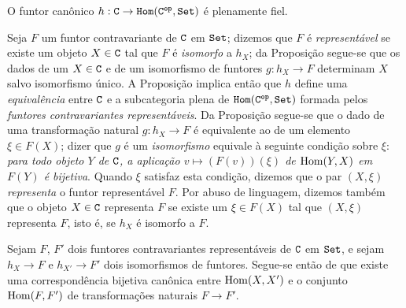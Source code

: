 \begin{proposition}[8.1.7]
\label{0.8.1.7}
O funtor canônico $h:\C\to\CHom(\C\op,\Set)$ é plenamente fiel.
\end{proposition}

\begin{env}[8.1.8]
\label{0.8.1.8}
Seja $F$ um funtor contravariante de $\mathtt{C}$ em $\mathtt{Set}$; dizemos que $F$ é \emph{representável} se
existe um objeto $X\in\mathtt{C}$ tal que $F$ é \emph{isomorfo} a $h_X$; da
Proposição  segue-se que os dados de um $X\in\mathtt{C}$ e de um isomorfismo de funtores
$g:h_X\to F$ determinam $X$ salvo isomorfismo único. A Proposição  implica então
que $h$ define uma \emph{equivalência} entre $\mathtt{C}$ e a subcategoria plena de
$\mathtt{Hom}(\mathtt{C}^\mathtt{op},\mathtt{Set})$ formada pelos \emph{funtores contravariantes representáveis}. Da
Proposição  segue-se que o dado de uma transformação natural $g:h_X\to F$ é
equivalente ao de um elemento $\xi\in F(X)$; dizer que $g$ é um \emph{isomorfismo} equivale
à seguinte condição sobre $\xi$: \emph{para todo objeto $Y$ de $\mathtt{C}$, a aplicação
$v\mapsto(F(v))(\xi)$ de $\operatorname{Hom}(Y,X)$ em $F(Y)$ é bijetiva}. Quando $\xi$ satisfaz esta condição,
dizemos que o par $(X,\xi)$ \emph{representa} o funtor representável $F$. Por abuso de linguagem,
dizemos também que o objeto $X\in\mathtt{C}$ representa $F$ se existe um $\xi\in F(X)$ tal que
$(X,\xi)$ representa $F$, isto é, se $h_X$ é isomorfo a $F$.

Sejam $F$, $F'$ dois funtores contravariantes representáveis de $\mathtt{C}$ em $\mathtt{Set}$, e sejam $h_X\to F$ e
$h_{X'}\to F'$ dois isomorfismos de funtores. Segue-se então de  que
existe uma correspondência bijetiva canônica entre $\operatorname{Hom}(X,X')$ e o conjunto $\operatorname{Hom}(F,F')$ de
transformações naturais $F\to F'$.
\end{env}

